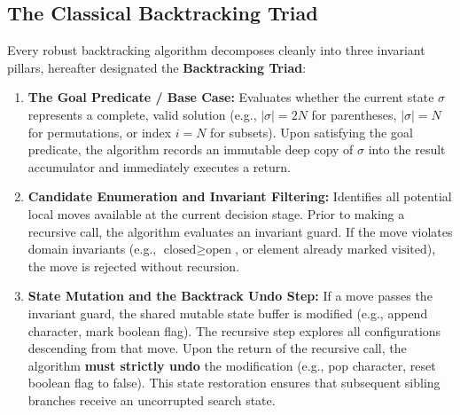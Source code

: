 \documentclass[10pt,journal,compsoc,onecolumn]{IEEEtran}
\begin{document}
\subsection{The Classical Backtracking Triad}
Every robust backtracking algorithm decomposes cleanly into three invariant pillars, hereafter designated the \textbf{Backtracking Triad}:
\begin{enumerate}
    \item \textbf{The Goal Predicate / Base Case:} Evaluates whether the current state $\sigma$ represents a complete, valid solution (e.g., $|\sigma| = 2N$ for parentheses, $|\sigma| = N$ for permutations, or index $i = N$ for subsets). Upon satisfying the goal predicate, the algorithm records an immutable deep copy of $\sigma$ into the result accumulator and immediately executes a return.
    \item \textbf{Candidate Enumeration and Invariant Filtering:} Identifies all potential local moves available at the current decision stage. Prior to making a recursive call, the algorithm evaluates an invariant guard. If the move violates domain invariants (e.g., $\text{closed} \ge \text{open}$, or element already marked $\text{visited}$), the move is rejected without recursion.
    \item \textbf{State Mutation and the Backtrack Undo Step:} If a move passes the invariant guard, the shared mutable state buffer is modified (e.g., append character, mark boolean flag). The recursive step explores all configurations descending from that move. Upon the return of the recursive call, the algorithm \textbf{must strictly undo} the modification (e.g., pop character, reset boolean flag to false). This state restoration ensures that subsequent sibling branches receive an uncorrupted search state.
\end{enumerate}
\end{document}
